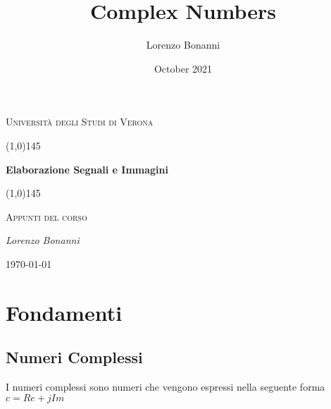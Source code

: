 \documentclass{article}
\title{Complex Numbers}
\author{Lorenzo Bonanni}
\date{October 2021}
\begin{document}
    \clearpage

    \begin{titlepage}
       \centering
       \vspace*{\fill}
       {\scshape\LARGE Università degli Studi di Verona \par}
       \vspace{1.5cm}
       \line(1,0){145} \\
       {\huge\bfseries Elaborazione Segnali e Immagini\par}
       \line(1,0){145} \\
       \vspace{0.5cm}
       {\scshape\Large Appunti del corso\par}
       \vspace{2cm}
       {\Large\itshape Lorenzo Bonanni \par}
       \vspace{1cm}

       \vspace{5cm}
       \vspace*{\fill}
       {\large \today\par}
    \end{titlepage}
    \thispagestyle{empty}

    \tableofcontents

    \newpage
    
    \section{Fondamenti}
    \subsection{Numeri Complessi}
    I numeri complessi sono numeri che vengono espressi nella seguente forma\\ $c=Re+jIm$
    
\end{document}
